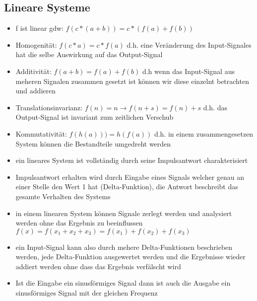 \documentclass{article} %
\begin{document}
	\subsection{Lineare Systeme}
	\begin{itemize}
		\item f ist linear gdw: $f(c*(a+b)) = c*(f(a) + f(b))$
		\item Homogenität: $f(c*a) = c*f(a)$ d.h. eine Veränderung des Input-Signales hat die selbe Auswirkung auf das Output-Signal
		\item Additivität: $f(a+b) = f(a) + f(b)$ d.h wenn das Input-Signal aus meheren Signalen zusammen gesetzt ist können wir diese einzelnt betrachten und addieren
		\item Translationsinvarianz: $f(n) =  n \rightarrow f(n+s) = f(n)+s$ d.h. das Output-Signal ist invariant zum zeitlichen Verschub
		\item Kommutativität: $f(h(a))) = h(f(a))$ d.h. in einem zusammengesetzen System können die Bestandteile umgedreht werden
		\item ein lineares System ist vollständig durch seine Impulsantwort charakterisiert
		\item Impulsantwort erhalten wird durch Eingabe eines Signals welcher genau an einer Stelle den Wert 1 hat (Delta-Funktion), die Antwort beschreibt das gesamte Verhalten des Systems
		\item in einem linearen System können Signale zerlegt werden und analysiert werden ohne das Ergebnis zu beeinflussen $f(x) = f(x_1+x_2+x_3) = f(x_1)+f(x_2)+f(x_3)$
		\item ein Input-Signal kann also durch mehere Delta-Funktionen beschrieben werden, jede Delta-Funktion ausgewertet werden und die Ergebnisse wieder addiert werden ohne dass das Ergebnis verfälscht wird
		\item Ist die Eingabe ein sinusförmiges Signal dann ist auch die Ausgabe ein sinusförmiges Signal mit der gleichen Frequenz
	\end{itemize}
\end{document}
